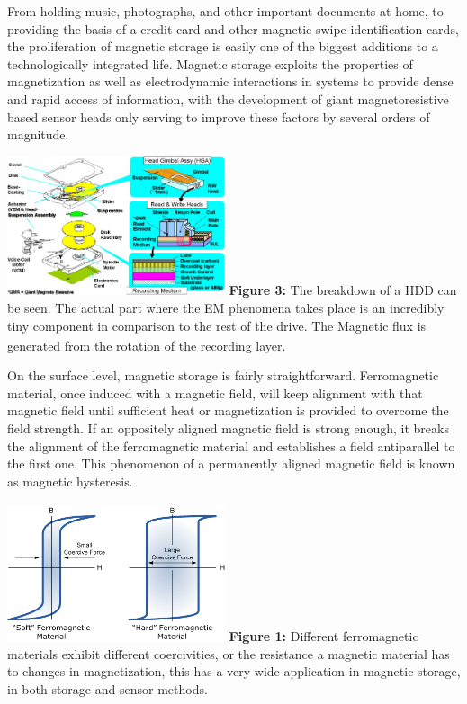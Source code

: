 \documentclass[11pt]{article}
\begin{document}
\begin{multicols}{2} %
From holding music, photographs, and other important documents at home, to providing the basis of a credit card and other magnetic swipe identification cards, the proliferation of magnetic storage is easily one of the biggest additions to a technologically integrated life. Magnetic storage exploits the properties of magnetization as well as electrodynamic interactions in systems to provide dense and rapid access of information, with the development of giant magnetoresistive based sensor heads only serving to improve these factors by several orders of magnitude.

\begin{center}
	\centering
	\includegraphics[width=0.48\textwidth]{HDD_Makeup.png}
	{\footnotesize\textbf{Figure 3:} The breakdown of a HDD can be seen. The actual part where the EM phenomena takes place is an incredibly tiny component in comparison to the rest of the drive\textsubscript{\cite{label6}}. The Magnetic flux is generated from the rotation of the recording layer. }
\end{center} 

On the surface level, magnetic storage is fairly straightforward. Ferromagnetic material, once induced with a magnetic field, will keep alignment with that magnetic field until sufficient heat or magnetization is provided to overcome the field strength. If an oppositely aligned magnetic field is strong enough, it breaks the alignment of the ferromagnetic material and establishes a field antiparallel to the first one. This phenomenon of a permanently aligned magnetic field is known as magnetic hysteresis\textsubscript{\cite{label1}}.

\begin{center}
	\centering
	\includegraphics[width=0.48\textwidth]{mag_hysterisis.png}
	{\footnotesize\textbf{Figure 1:} Different ferromagnetic materials exhibit different coercivities, or the resistance a magnetic material has to changes in magnetization, this has a very wide application in magnetic storage, in both storage and sensor methods.\textsubscript{\cite{label7}}}
\end{center} 


\end{multicols}
\end{document}
